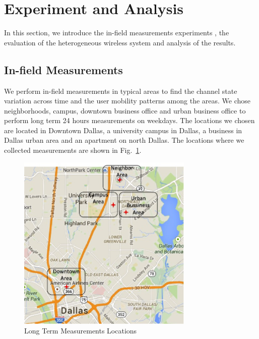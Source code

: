 \section{Experiment and Analysis}
\label{sec:experiment}

In this section, we introduce the in-field measurements experiments 
, the evaluation of the heterogeneous wireless system 
and analysis of the results.

\subsection{In-field Measurements}
\label{subsec:measurements}

We perform in-field measurements in typical areas to find the channel state variation across 
time and the user mobility patterns among the areas.
We chose neighborhoods, campus, downtown business office and 
urban business office to perform long term 24 hours measurements on weekdays. 
The locations we chosen are located in Downtown Dallas, a university campus in Dallas, 
a business in Dallas urban area and an apartment on north Dallas. 
The locations where we collected measurements are shown in Fig.~\ref{fig:measurement_map}.

\begin{figure}
\vspace{-0.0in}
\centering
\includegraphics[width=84mm]{figures/measurements_map}
\vspace{-0.1in}
\caption{Long Term Measurements Locations}
\label{fig:measurement_map}
\vspace{-0.1in}
\end{figure}

